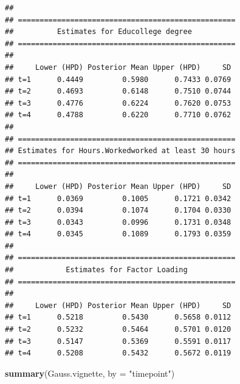 \documentclass[a4paper, preprint, 3p,
authoryear]{elsarticle} %
\newenvironment{Shaded}{\begin{snugshade}}{\end{snugshade}}
\newcommand{\AttributeTok}[1]{\textcolor[rgb]{0.13,0.29,0.53}{#1}}
\newcommand{\FunctionTok}[1]{\textcolor[rgb]{0.13,0.29,0.53}{\textbf{#1}}}
\newcommand{\NormalTok}[1]{#1}
\newcommand{\StringTok}[1]{\textcolor[rgb]{0.31,0.60,0.02}{#1}}
\begin{document}
\begin{verbatim}
## 
## ==================================================
##          Estimates for Educollege degree
## ==================================================
## 
##     Lower (HPD) Posterior Mean Upper (HPD)     SD
## t=1      0.4449         0.5980      0.7433 0.0769
## t=2      0.4693         0.6148      0.7510 0.0744
## t=3      0.4776         0.6224      0.7620 0.0753
## t=4      0.4788         0.6220      0.7710 0.0762
## 
## ==================================================
## Estimates for Hours.Workedworked at least 30 hours
## ==================================================
## 
##     Lower (HPD) Posterior Mean Upper (HPD)     SD
## t=1      0.0369         0.1005      0.1721 0.0342
## t=2      0.0394         0.1074      0.1704 0.0330
## t=3      0.0343         0.0996      0.1731 0.0348
## t=4      0.0345         0.1089      0.1793 0.0359
## 
## ==================================================
##            Estimates for Factor Loading
## ==================================================
## 
##     Lower (HPD) Posterior Mean Upper (HPD)     SD
## t=1      0.5218         0.5430      0.5658 0.0112
## t=2      0.5232         0.5464      0.5701 0.0120
## t=3      0.5147         0.5369      0.5591 0.0117
## t=4      0.5208         0.5432      0.5672 0.0119
\end{verbatim}

\begin{Shaded}
\begin{Highlighting}[]
\FunctionTok{summary}\NormalTok{(Gauss.vignette, }\AttributeTok{by =} \StringTok{"timepoint"}\NormalTok{)}
\end{Highlighting}
\end{Shaded}
\end{document}
